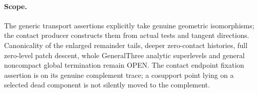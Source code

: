 \paragraph{Scope.}
The generic transport assertions explicitly take genuine geometric
isomorphisms; the contact producer constructs them from actual tests and
tangent directions. Canonicality of the enlarged remainder tails, deeper
zero-contact histories, full zero-level patch descent, whole GeneralThree
analytic superlevels and general noncompact global termination remain OPEN.
The contact endpoint fixation assertion is on its genuine complement trace;
a cosupport point lying on a selected dead component is not silently moved
to the complement.
